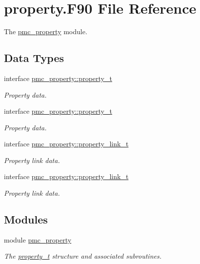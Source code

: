 \hypertarget{property_8_f90}{}\section{property.\+F90 File Reference}
\label{property_8_f90}


The \mbox{\hyperlink{namespacepmc__property}{pmc\+\_\+property}} module.  


\subsection*{Data Types}
\begin{DoxyCompactItemize}
\item 
interface \mbox{\hyperlink{structpmc__property_1_1property__t}{pmc\+\_\+property\+::property\+\_\+t}}
\begin{DoxyCompactList}\small\item\em Property data. \end{DoxyCompactList}\item 
interface \mbox{\hyperlink{structpmc__property_1_1property__t}{pmc\+\_\+property\+::property\+\_\+t}}
\begin{DoxyCompactList}\small\item\em Property data. \end{DoxyCompactList}\item 
interface \mbox{\hyperlink{structpmc__property_1_1property__link__t}{pmc\+\_\+property\+::property\+\_\+link\+\_\+t}}
\begin{DoxyCompactList}\small\item\em Property link data. \end{DoxyCompactList}\item 
interface \mbox{\hyperlink{structpmc__property_1_1property__link__t}{pmc\+\_\+property\+::property\+\_\+link\+\_\+t}}
\begin{DoxyCompactList}\small\item\em Property link data. \end{DoxyCompactList}\end{DoxyCompactItemize}
\subsection*{Modules}
\begin{DoxyCompactItemize}
\item 
module \mbox{\hyperlink{namespacepmc__property}{pmc\+\_\+property}}
\begin{DoxyCompactList}\small\item\em The \mbox{\hyperlink{structpmc__property_1_1property__t}{property\+\_\+t}} structure and associated subroutines. \end{DoxyCompactList}\end{DoxyCompactItemize}

